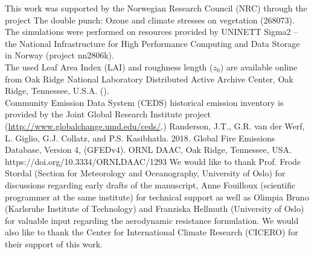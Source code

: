\documentclass[gmd, manuscript]{copernicus}
\begin{document}








\begin{acknowledgements}
  This work was supported by the Norwegian Research Council (NRC) through the project The double punch: Ozone and climate stresses on vegetation (268073).\\
  The simulations were performed on resources provided by UNINETT Sigma2 -- the National Infrastructure for High Performance Computing and Data Storage in Norway (project nn2806k).\\
  The used Leaf Area Index (LAI) and roughness length ($z_0$) are available online from Oak Ridge National Laboratory Distributed Active Archive Center, Oak Ridge, Tennessee, U.S.A. ().\\
  Community Emission Data System (CEDS) historical emission inventory is provided by the Joint Global Research Institute project (\url{http://www.globalchange.umd.edu/ceds/}.)
  Randerson, J.T., G.R. van der Werf, L. Giglio, G.J. Collatz, and P.S. Kasibhatla. 2018. Global Fire Emissions Database, Version 4, (GFEDv4). ORNL DAAC, Oak Ridge, Tennessee, USA. https://doi.org/10.3334/ORNLDAAC/1293
  We would like to thank Prof. Frode Stordal (Section for Meteorology and Oceanography, University of Oslo) for discussions regarding early drafts of the manuscript, Anne Fouilloux (scientific programmer at the same institute) for technical support as well as Olimpia Bruno (Karlsruhe Institute of Technology) and Franziska Hellmuth (University of Oslo) for valuable input regarding the aerodynamic resistance formulation.
  We would also like to thank the Center for International Climate Research (CICERO) for their support of this work.
\end{acknowledgements}
\end{document}
